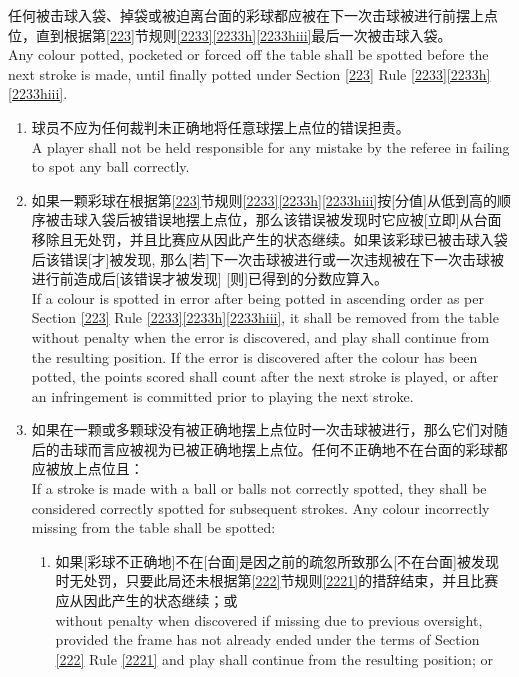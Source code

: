 \noindent 任何被击球入袋、掉袋或被迫离台面的彩球都应被在下一次击球被进行前摆上点位，直到根据第\ref{223}节规则\ref{2233}\ref{2233h}\ref{2233hiii}最后一次被击球入袋。\\
Any colour potted, pocketed or forced off the table shall be spotted before the next stroke is made, until finally potted under Section \ref{223} Rule \ref{2233}\ref{2233h}\ref{2233hiii}.
\begin{enumerate}[label=(\alph*)]
    \item 球员不应为任何裁判未正确地将任意球摆上点位的错误担责。\\
    A player shall not be held responsible for any mistake by the referee in failing to spot any ball correctly.
    \item 如果一颗彩球在根据第\ref{223}节规则\ref{2233}\ref{2233h}\ref{2233hiii}按[分值]从低到高的顺序被击球入袋后被错误地摆上点位，那么该错误被发现时它应被[立即]从台面移除且无处罚，并且比赛应从因此产生的状态继续。如果该彩球已被击球入袋后该错误[才]被发现, 那么[若]下一次击球被进行或一次违规被在下一次击球被进行前造成后[该错误才被发现] [则]已得到的分数应算入。\\
    If a colour is spotted in error after being potted in ascending order as per Section \ref{223} Rule \ref{2233}\ref{2233h}\ref{2233hiii}, it shall be removed from the table without penalty when the error is discovered, and play shall continue from the resulting position. If the error is discovered after the colour has been potted, the points scored shall count after the next stroke is played, or after an infringement is committed prior to playing the next stroke.
    \item \label{2237c}如果在一颗或多颗球没有被正确地摆上点位时一次击球被进行，那么它们对随后的击球而言应被视为已被正确地摆上点位。任何不正确地不在台面的彩球都应被放上点位且：\\
    If a stroke is made with a ball or balls not correctly spotted, they shall be considered correctly spotted for subsequent strokes. Any colour incorrectly missing from the table shall be spotted:
    \begin{enumerate}[label=(\roman*)]
        \item 如果[彩球不正确地]不在[台面]是因之前的疏忽所致那么[不在台面]被发现时无处罚，只要此局还未根据第\ref{222}节规则\ref{2221}的措辞结束，并且比赛应从因此产生的状态继续；或\\
        without penalty when discovered if missing due to previous oversight, provided the frame has not already ended under the terms of Section \ref{222} Rule \ref{2221} and play shall continue from the resulting position; or

\end{enumerate}
\end{enumerate}
